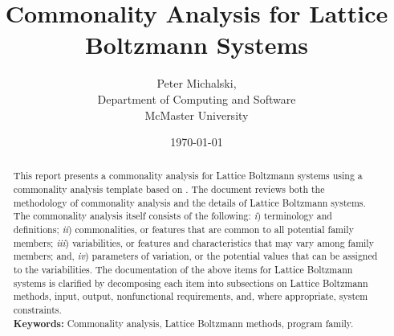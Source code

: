 \documentclass[12pt]{article}
\begin{document}
\title{\bf{Commonality Analysis for Lattice Boltzmann Systems}} 
\author{Peter Michalski, \\Department of Computing and Software\\McMaster University}
\date{\today}

\begin{titlepage}
	\clearpage\maketitle
	\thispagestyle{empty}
	\begin{abstract}
		This report presents a commonality analysis for Lattice Boltzmann systems using a commonality analysis template based on \cite{SmithAndChen2004}. The document reviews both the methodology of commonality analysis and the details of Lattice Boltzmann systems. The commonality analysis itself consists of the following:
		\textit{i}) terminology and definitions; \textit{ii}) commonalities, or features that are common to all potential family members; \textit{iii}) variabilities, or features and characteristics that may vary among family members; and, \textit{iv}) parameters of variation, or the potential values that can be assigned to the variabilities. 
		The documentation of the above items for Lattice Boltzmann systems is clarified by decomposing each item into subsections on Lattice Boltzmann methods, input, output, nonfunctional requirements, and, where appropriate, system constraints.\\
		
		\noindent\textbf{Keywords:} Commonality analysis, Lattice Boltzmann methods, program family.
		
	\end{abstract}
\end{titlepage}


\newpage

\tableofcontents

\newpage

\end{document}
